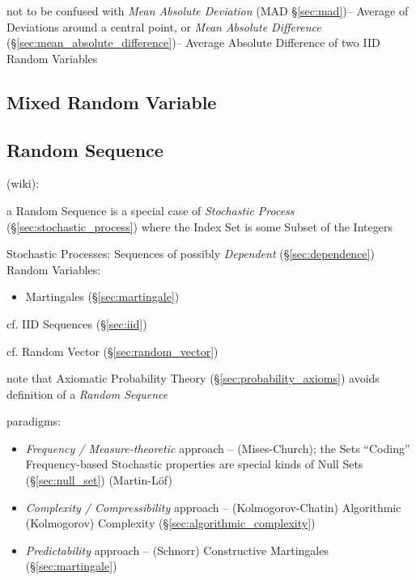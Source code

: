 \fist not to be confused with \emph{Mean Absolute Deviation} (MAD
\S\ref{sec:mad})-- Average of Deviations around a central point, or \emph{Mean
  Absolute Difference} (\S\ref{sec:mean_absolute_difference})-- Average Absolute
Difference of two IID Random Variables



\subsection{Mixed Random Variable}\label{sec:mixed_random_variable}

\subsection{Random Sequence}\label{sec:random_sequence}

(wiki):

a Random Sequence is a special case of \emph{Stochastic Process}
(\S\ref{sec:stochastic_process}) where the Index Set is some Subset of the
Integers

Stochastic Processes: Sequences of possibly \emph{Dependent}
(\S\ref{sec:dependence}) Random Variables:
\begin{itemize}
  \item Martingales (\S\ref{sec:martingale})
\end{itemize}
cf. IID Sequences (\S\ref{sec:iid})

cf. Random Vector (\S\ref{sec:random_vector})

note that Axiomatic Probability Theory (\S\ref{sec:probability_axioms})
avoids definition of a \emph{Random Sequence}

paradigms:
\begin{itemize}
  \item \emph{Frequency / Measure-theoretic} approach -- (Mises-Church); the
    Sets ``Coding'' Frequency-based Stochastic properties are special kinds of
    Null Sets (\S\ref{sec:null_set}) (Martin-L\"of)
  \item \emph{Complexity / Compressibility} approach -- (Kolmogorov-Chatin)
    Algorithmic (Kolmogorov) Complexity (\S\ref{sec:algorithmic_complexity})
  \item \emph{Predictability} approach -- (Schnorr) Constructive Martingales
    (\S\ref{sec:martingale})
\end{itemize}

